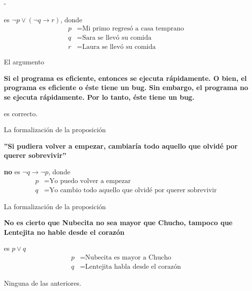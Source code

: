 \documentclass[12pt, a4paper]{exam}
\makeatletter
\renewenvironment{checkboxes}%
   {\setcounter{choice}{0}\list{\checkbox@char}%
      {%
        \settowidth{\leftmargin}{W.\hskip\labelsep\hskip 2.5em}%
        \def\choice{%
          \if@correctchoice
            \color@endgroup \endgroup
          \fi
          \stepcounter{choice}
          \item[\checked@char]
          \do@choice@pageinfo
        } %
        \def\CorrectChoice{%
          \if@correctchoice
            \color@endgroup \endgroup
          \fi
          \ifprintanswers
            \ifhmode \unskip\unskip\unvbox\voidb@x \fi
            \begingroup \color@begingroup \@correctchoicetrue
            \CorrectChoice@Emphasis
            \stepcounter{choice}
            \item[\checked@char]
          \else
            \stepcounter{choice}
            \item[\checked@char]
          \fi
          \do@choice@pageinfo
        } %
        \let\correctchoice\CorrectChoice
        \labelwidth\leftmargin\advance\labelwidth-\labelsep
        \topsep=0pt
        \partopsep=0pt
        \checkboxeshook
      }%
   }%
   {\if@correctchoice \color@endgroup \endgroup \fi \endlist}
\makeatother
\begin{document}
\begin{questions}
\begin{checkboxes}
            es $\neg p \lor (\neg q \rightarrow r)$, donde 
            \begin{align*}
                p &= \text{Mi primo regresó a casa temprano} \\ 
                q &= \text{Sara se llevó su comida} \\ 
                r &= \text{Laura se llevó su comida}
            \end{align*}

            \choice El argumento 
            \begin{center}
                \textbf{Si el programa es eficiente, entonces se ejecuta 
                rápidamente. O bien, el programa es eficiente o éste tiene 
                un bug. Sin embargo, el programa no se ejecuta rápidamente. 
                Por lo tanto, éste tiene un bug. }
            \end{center}

            es correcto. %

            \choice La formalización de la proposición
            \begin{center}
                \textbf{''Si pudiera volver a empezar, cambiaría todo aquello 
                que olvidé por querer sobrevivir''}
            \end{center}

            \textbf{no} es $\neg q \rightarrow \neg p$, donde 
            \begin{align*}
                p &= \text{Yo puedo volver a empezar} \\ 
                q &= \text{Yo cambio todo aquello que olvidé por querer 
                sobrevivir}
            \end{align*} 

            \choice La formalización de la proposición
            \begin{center}
              \textbf{No es cierto que Nubecita no sea mayor que Chucho, tampoco
                que Lentejita no hable desde el corazón}
            \end{center}

            es $p \lor q$
            \begin{align*}
                p &= \text{Nubecita es mayor a Chucho} \\ 
                q &= \text{Lentejita habla desde el corazón} 
            \end{align*}
            
            \choice Ninguna de las anteriores. 
        \end{checkboxes}


\end{questions}
\end{document}
